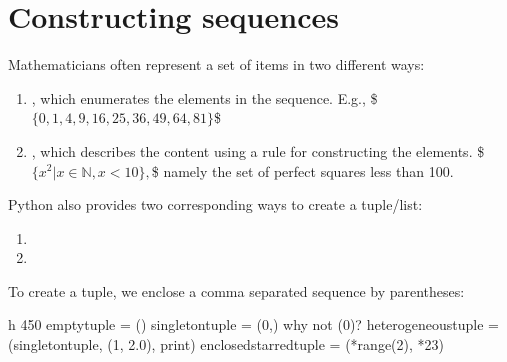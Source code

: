 \documentclass[letterpaper,10pt,english]{sphinxmanual}
\begin{document}
\section{Constructing sequences}
\label{\detokenize{Lecture7/Lists and Tuples:constructing-sequences}}

Mathematicians often represent a set of items in two different ways:
\begin{enumerate}
%
\item {} 
, which enumerates the elements in the sequence. E.g.,
\$\( \{0, 1, 4, 9, 16, 25, 36, 49, 64, 81\} \)\$

\item {} 
, which describes the content using a rule for constructing the elements.
\$\( \{x^2| x\in \mathbb{N}, x< 10 \}, \)\$
namely the set of perfect squares less than 100.

\end{enumerate}

Python also provides two corresponding ways to create a tuple/list:
\begin{enumerate}
%
\item {} 

\item {} 

\end{enumerate}


To create a tuple, we enclose a comma separated sequence by parentheses:

\begin{sphinxVerbatim}[commandchars=\\\{\}]
 \PYGZhy{}h 450
empty\PYGZus{}tuple = ()
singleton\PYGZus{}tuple = (0,)   \PYGZsh{} why not (0)?
heterogeneous\PYGZus{}tuple = (singleton\PYGZus{}tuple,
                       (1, 2.0),
                       print)
enclosed\PYGZus{}starred\PYGZus{}tuple = (*range(2),
                          *\PYGZsq{}23\PYGZsq{})
\end{sphinxVerbatim}
\end{document}
